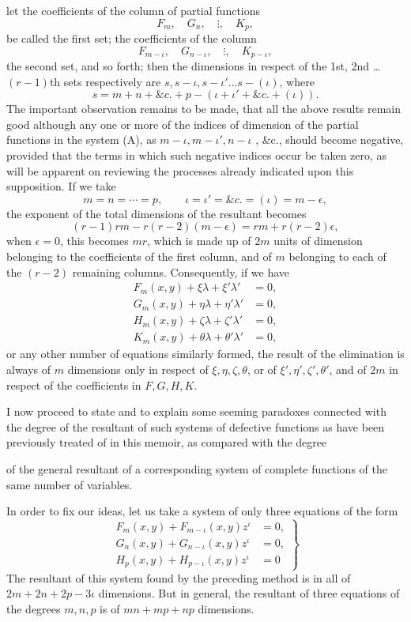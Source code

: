 \documentclass[11pt]{article}
\newcommand{\sourcepage}[1]{\marginpar{\scriptsize p.~#1}}
\begin{document}
{{\sourcepage{261}
let the coefficients of the column of partial functions
\[
F_m,
\quad G_n,
\quad \vdots,
\quad K_p,
\]
be called the first set; the coefficients of the column
\[
F_{m-\iota},
\quad G_{n-\iota},
\quad \vdots,
\quad K_{p-\iota},
\]
the second set, and so forth; then the dimensions in respect of the 1st, 2nd \ldots $(r-1)$th sets respectively are $s,s-\iota,s-\iota'\ldots s-(\iota)$, where
\[
s=m+n+\&c.+p-(\iota+\iota'+\&c.+(\iota)).
\]
The important observation remains to be made, that all the above results remain good although any one or more of the indices of dimension of the partial functions in the system (A), as $m-\iota,m-\iota',n-\iota$ , \&c., should become negative, provided that the terms in which such negative indices occur be taken zero, as will be apparent on reviewing the processes already indicated upon this supposition. If we take
\[
m=n=\cdots=p,
\qquad
\iota=\iota'=\&c.=(\iota)=m-\epsilon,
\]
the exponent of the total dimensions of the resultant becomes
\[
(r-1)rm-r(r-2)(m-\epsilon)=rm+r(r-2)\epsilon,
\]
when $\epsilon=0$, this becomes $mr$, which is made up of $2m$ units of dimension belonging to the coefficients of the first column, and of $m$ belonging to each of the $(r-2)$ remaining columns. Consequently, if we have
\[
\begin{aligned}
F_m(x,y)+\xi\lambda+\xi'\lambda'&=0,\\
G_m(x,y)+\eta\lambda+\eta'\lambda'&=0,\\
H_m(x,y)+\zeta\lambda+\zeta'\lambda'&=0,\\
K_m(x,y)+\theta\lambda+\theta'\lambda'&=0,
\end{aligned}
\]
or any other number of equations similarly formed, the result of the elimination is always of $m$ dimensions only in respect of $\xi,\eta,\zeta,\theta$, or of $\xi',\eta',\zeta',\theta'$, and of $2m$ in respect of the coefficients in $F,G,H,K$.

I now proceed to state and to explain some seeming paradoxes connected with the degree of the resultant of such systems of defective functions as have been previously treated of in this memoir, as compared with the degree

\sourcepage{262}
of the general resultant of a corresponding system of complete functions of the same number of variables.

In order to fix our ideas, let us take a system of only three equations of the form
\[
\left.
\begin{aligned}
F_m(x,y)+F_{m-\iota}(x,y)z^\iota&=0,\\
G_n(x,y)+G_{n-\iota}(x,y)z^\iota&=0,\\
H_p(x,y)+H_{p-\iota}(x,y)z^\iota&=0
\end{aligned}
\right\}\tag{B}
\]
The resultant of this system found by the preceding method is in all of $2m+2n+2p-3\iota$ dimensions. But in general, the resultant of three equations of the degrees $m,n,p$ is of $mn+mp+np$ dimensions.

}}
\end{document}
